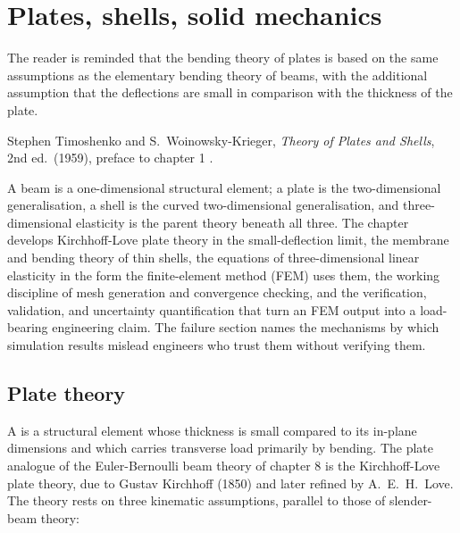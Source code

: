 \chapter{Plates, shells, solid mechanics}
\label{vol03:ch09}

\epigraph{The reader is reminded that the bending theory of plates is
based on the same assumptions as the elementary bending theory of
beams, with the additional assumption that the deflections are small
in comparison with the thickness of the plate.}{Stephen Timoshenko
and S.\ Woinowsky-Krieger, \emph{Theory of Plates and Shells}, 2nd
ed.\ (1959), preface to chapter 1
\cite[p.~v]{text:timoshenko-plates-shells}.}


\noindent
A beam is a one-dimensional structural element; a plate is the
two-dimensional generalisation, a shell is the curved two-dimensional
generalisation, and three-dimensional elasticity is the parent theory
beneath all three. The chapter develops Kirchhoff-Love plate theory
in the small-deflection limit, the membrane and bending theory of
thin shells, the equations of three-dimensional linear elasticity in
the form the finite-element method (FEM) uses them, the working
discipline of mesh generation and convergence checking, and the
verification, validation, and uncertainty quantification that turn
an FEM output into a load-bearing engineering claim. The failure
section names the mechanisms by which simulation results mislead
engineers who trust them without verifying them.

\section{Plate theory}

A  is a structural element whose thickness is small
compared to its in-plane dimensions and which carries transverse load
primarily by bending. The plate analogue of the Euler-Bernoulli beam
theory of chapter 8 is the Kirchhoff-Love plate theory, due to
Gustav Kirchhoff (1850) and later refined by A.\ E.\ H.\ Love. The
theory rests on three kinematic assumptions, parallel to those of
slender-beam theory:

